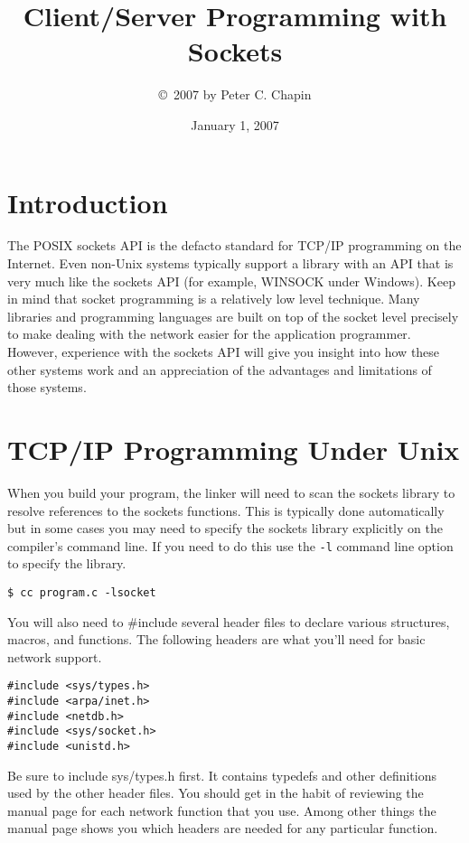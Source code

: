 \documentclass{article}
\begin{document}
\title{Client/Server Programming with Sockets}
\author{\copyright\ 2007 by Peter C. Chapin}
\date{January 1, 2007}
\maketitle

\section*{Introduction}

The POSIX sockets API is the defacto standard for TCP/IP programming on the Internet. Even non-Unix systems typically support a library with an API that is very much like the sockets API (for example, WINSOCK under Windows). Keep in mind that socket programming is a relatively low level technique. Many libraries and programming languages are built on top of the socket level precisely to make dealing with the network easier for the application programmer. However, experience with the sockets API will give you insight into how these other systems work and an appreciation of the advantages and limitations of those systems.

\section{TCP/IP Programming Under Unix}

When you build your program, the linker will need to scan the sockets library to resolve references to the sockets functions. This is typically done automatically but in some cases you may need to specify the sockets library explicitly on the compiler's command line. If you need to do this use the \texttt{-l} command line option to specify the library.

\begin{verbatim}
$ cc program.c -lsocket
\end{verbatim}

You will also need to \#include several header files to declare various structures, macros, and functions. The following headers are what you'll need for basic network support.

\begin{verbatim}
#include <sys/types.h>
#include <arpa/inet.h>
#include <netdb.h>
#include <sys/socket.h>
#include <unistd.h>
\end{verbatim}

Be sure to include sys/types.h first. It contains typedefs and other definitions used by the other header files. You should get in the habit of reviewing the manual page for each network function that you use. Among other things the manual page shows you which headers are needed for any particular function.
\end{document}
